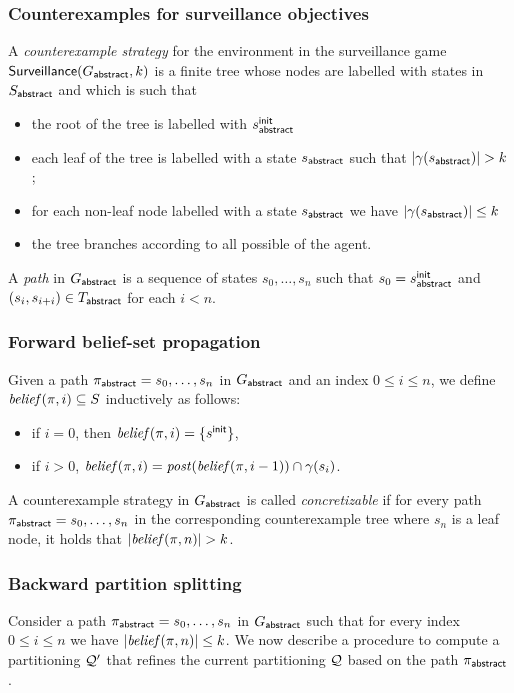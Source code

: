 \subsubsection{Counterexamples for surveillance objectives}
A \emph{counterexample strategy} for the environment in the surveillance game $\mathsf{Surveillance}(G_{\mathsf{abstract}},k)$ is a finite tree whose nodes are labelled with states in $S_{\mathsf{abstract}}$ and which is such that
\begin{itemize}
\item the root of the tree is labelled with $s_{\mathsf{abstract}}^{\mathsf{init}}$
\item each leaf of the tree is labelled with a state $s_{\mathsf{abstract}}$ such that  $|\gamma(s_{\mathsf{abstract}})|  > k$;
\item for each non-leaf node labelled with a state $s_{\mathsf{abstract}}$ we have $|\gamma(s_{\mathsf{abstract}})|  \leq k$
\item the tree branches according to all possible of the agent.
\end{itemize}

A \emph{path} in $G_{\mathsf{abstract}}$ is a sequence of states $s_0,\ldots,s_n$ such that $s_0 = s_{\mathsf{abstract}}^{\mathsf{init}}$ and $(s_i,s_{i+i}) \in T_{\mathsf{abstract}}$ for each $i < n$.

\subsubsection{Forward belief-set propagation}
Given a path $\pi_{\mathsf{abstract}} = s_0,\ldots,s_n$ in $G_{\mathsf{abstract}}$ and an index $0 \leq i \leq n$, we define $\mathit{belief}(\pi,i)\subseteq S$ inductively as follows:
\begin{itemize}
\item if $i = 0$, then $\mathit{belief}(\pi,i) = \{s^{\mathsf{init}}\}$,
\item if $i > 0$, $\mathit{belief}(\pi,i) = \mathit{post}(\mathit{belief}(\pi,i-1)) \cap \gamma(s_i)$.
\end{itemize}

A counterexample strategy in $G_{\mathsf{abstract}}$ is called \emph{concretizable} if for every path $\pi_{\mathsf{abstract}} = s_0,\ldots,s_n$ in the corresponding counterexample tree where $s_n$ is a leaf node, it holds that $|\mathit{belief}(\pi,n)| > k$.

\subsubsection{Backward partition splitting}
Consider a path $\pi_{\mathsf{abstract}} = s_0,\ldots,s_n$ in $G_{\mathsf{abstract}}$ such that for every index $0 \leq i \leq n$ we have $|\mathit{belief}(\pi,n)| \leq k$. We now describe a procedure to compute a partitioning $\mathcal{Q}'$ that refines the current partitioning $\mathcal{Q}$ based on the path $\pi_{\mathsf{abstract}}$.


